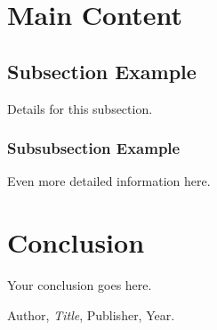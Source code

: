 \section{Main Content}
\subsection{Subsection Example}
Details for this subsection.

\subsubsection{Subsubsection Example}
Even more detailed information here.

\section{Conclusion}
Your conclusion goes here.

\begin{thebibliography}{9}
 Author, \textit{Title}, Publisher, Year.
\end{thebibliography}


